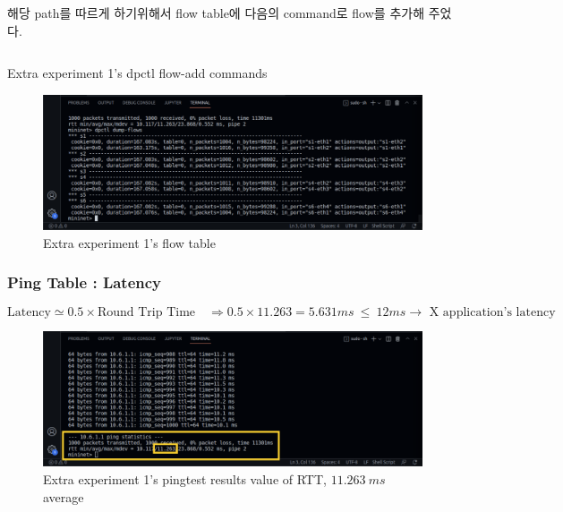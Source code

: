             해당 path를 따르게 하기위해서 flow table에 다음의 command로 flow를 추가해 주었다.
            \begin{listing}[h!]
            \inputminted[framerule = 1pt,framesep = 2mm , frame = lines, fontsize=\footnotesize]{python}{./code/week08/flow-e1.sh}
            \vspace{-5mm}
            \caption{\footnotesize Extra experiment 1's dpctl flow-add commands}
            \end{listing}
                \vspace{-4mm}
            \begin{figure}[!h]\centering 
            	\includegraphics[width=.99\textwidth]{image/week08/e1-1.png}
            	\caption{\footnotesize
            	 Extra experiment 1's flow table}
            	\vspace{-10pt}
            \end{figure}

        \subsubsection*{Ping Table : Latency}
            \vspace{-5mm}
        \begin{equation*}
            \text{Latency} \simeq 0.5 \times \text{Round Trip Time} \quad \Rightarrow 0.5 \times 11.263 = 5.631 ms\ \leq\ 12 ms \to \text{ X application's latency}
        \end{equation*}
            \vspace{-4mm}
        \begin{figure}[!h]\centering 
        	\includegraphics[width=.88\textwidth]{image/week08/e1-2.png}
        	\caption{\footnotesize
        	 Extra experiment 1's pingtest results value of RTT, $11.263\ ms$ average}
        	\vspace{-10pt}
        \end{figure}
            \vspace{-5mm}
